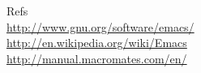 \documentclass[a4,landscape]{seminar}
\begin{document}
\begin{slide}
  {\Large Refs}\\[1ex]
    \url{http://www.gnu.org/software/emacs/}\\
    \url{http://en.wikipedia.org/wiki/Emacs}\\
    \url{http://manual.macromates.com/en/}
\end{slide}
\end{document}
